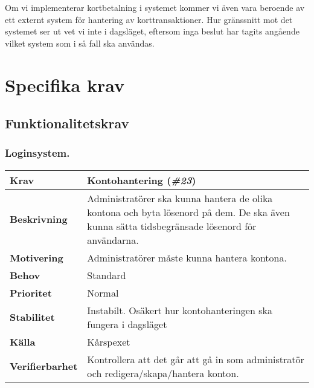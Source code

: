 \documentclass[a4paper, twoside, 11pt, titlepage]{article}
\begin{document}
	Om vi implementerar kortbetalning i systemet kommer vi även vara beroende av ett externt system för hantering av korttransaktioner. Hur gränssnitt mot det systemet ser ut vet vi inte i dagsläget, eftersom inga beslut har tagits angående vilket system som i så fall ska användas.

\clearpage
\section{Specifika krav}



	\subsection{Funktionalitetskrav}



		\subsubsection{Loginsystem.}


		\begin{tabular} { p{2.6cm} p{12.5cm} }
			\hline
			\sffamily\textbf{Krav} & Kontohantering (\emph{\#23})  \\
			\hline
			\sffamily\textbf{Beskrivning} & Administratörer ska kunna hantera de olika kontona och byta lösenord på dem. De ska även kunna sätta tidsbegränsade lösenord för användarna.   \\
			\hline
			\sffamily\textbf{Motivering} & Administratörer måste kunna hantera kontona.  \\
			\hline
			\sffamily\textbf{Behov} & Standard  \\
			\hline
			\sffamily\textbf{Prioritet} & Normal  \\
			\hline
			\sffamily\textbf{Stabilitet} & Instabilt. Osäkert hur kontohanteringen ska fungera i dagsläget  \\
			\hline
			\sffamily\textbf{Källa} & Kårspexet  \\
			\hline
			\sffamily\textbf{Verifierbarhet} & Kontrollera att det går att gå in som administratör och redigera/skapa/hantera konton.  \\
			\hline
		\end{tabular}
		\vspace{6mm}
\end{document}
